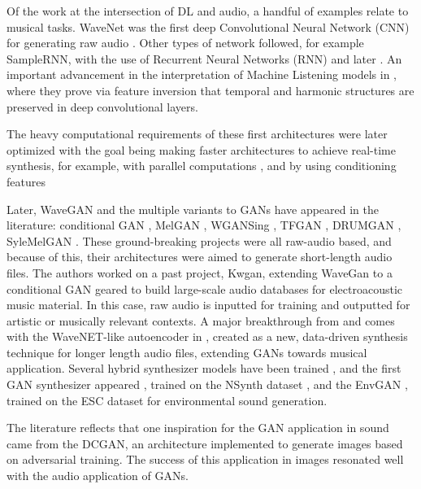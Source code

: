 \documentclass[a4paper,10pt,oneside]{article}
\begin{document}
\begin{sloppy}
{%

} 
Of the work at the intersection of DL and audio, a handful of examples relate to musical tasks. 
WaveNet was the first deep Convolutional Neural Network (CNN) for generating raw audio \cite{oord2016wavenet}. 
Other types of network followed, for example SampleRNN, with the use of Recurrent Neural Networks (RNN) \cite{mehri2017samplernn} and later \cite{kalchbrenner2018efficient}. 
An important advancement in the interpretation of Machine Listening models in \cite{saumitra_mishra_2018_1492527}, where they prove via feature inversion that temporal and harmonic structures are preserved in deep convolutional layers. 

The heavy computational requirements of these first architectures were later optimized with the goal being making faster architectures to achieve real-time synthesis, for example, with parallel computations \cite{oord2017parallel,yamamoto2020parallel,song2021improved}, and by using conditioning features \cite{lamtharn_hantrakul_2019_3527860}


Later, WaveGAN  \cite{Bollepalli_2017, donahue2018adversarial} and the multiple variants to GANs have appeared in the literature: 
conditional GAN \cite{2018Lee}, 
MelGAN \cite{NEURIPS2019_6804c9bc, jang2021universal}, 
WGANSing \cite{Chandna_2019}, 
TFGAN \cite{tian2020tfgan}, 
DRUMGAN \cite{javier_nistal_2020_4245504}, 
SyleMelGAN \cite{mustafa2021stylemelgan}.
These ground-breaking projects were all raw-audio based, and because of this, their architectures were aimed to generate short-length audio files. 
The authors worked on a past project, Kwgan, extending WaveGan to a conditional GAN geared to build large-scale audio databases for electroacoustic music material. In this case, raw audio is inputted for training and outputted for artistic or musically relevant contexts. 
A major breakthrough from \cite{oord2016wavenet} and \cite{mehri2017samplernn} comes with the WaveNET-like autoencoder in \cite{engel2017neural}, created as a new, data-driven synthesis technique for longer length audio files, extending GANs towards musical application. 
Several hybrid synthesizer models have been trained \cite{mccarthy2020hooligan}, and the first GAN synthesizer appeared \cite{engel2019gansynth}, trained on the NSynth dataset \cite{engel2017neural}, and the EnvGAN \cite{madhu2021envgan}, trained on the ESC dataset \cite{2015piczak} for environmental sound generation. 

The literature reflects that one inspiration for the GAN application in sound came from the DCGAN\cite{radford2015unsupervised}, an architecture implemented to generate images based on adversarial training. 
The success of this application in images resonated well with the audio application of GANs. 


\end{sloppy}
\end{document}
